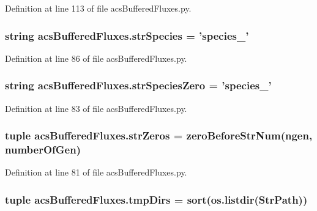 Definition at line 113 of file acs\-Buffered\-Fluxes.\-py.

\hypertarget{a00092_a36518d8de93502466a6d4b2e62eb7734}{
\subsubsection[{str\-Species}]{\setlength{\rightskip}{0pt plus 5cm}string acs\-Buffered\-Fluxes.\-str\-Species = 'species\-\_\-'}}\label{a00092_a36518d8de93502466a6d4b2e62eb7734}


Definition at line 86 of file acs\-Buffered\-Fluxes.\-py.

\hypertarget{a00092_a658920d97b6df23e672e290d362033b4}{
\subsubsection[{str\-Species\-Zero}]{\setlength{\rightskip}{0pt plus 5cm}string acs\-Buffered\-Fluxes.\-str\-Species\-Zero = 'species\-\_\-'}}\label{a00092_a658920d97b6df23e672e290d362033b4}


Definition at line 83 of file acs\-Buffered\-Fluxes.\-py.

\hypertarget{a00092_abfa8fbc48a0ad5b6dff6914d6052b2b6}{
\subsubsection[{str\-Zeros}]{\setlength{\rightskip}{0pt plus 5cm}tuple acs\-Buffered\-Fluxes.\-str\-Zeros = {\bf zero\-Before\-Str\-Num}(ngen, {\bf number\-Of\-Gen})}}\label{a00092_abfa8fbc48a0ad5b6dff6914d6052b2b6}


Definition at line 81 of file acs\-Buffered\-Fluxes.\-py.

\hypertarget{a00092_af740eb0100dc7010628161baeaf9b474}{
\subsubsection[{tmp\-Dirs}]{\setlength{\rightskip}{0pt plus 5cm}tuple acs\-Buffered\-Fluxes.\-tmp\-Dirs = sort(os.\-listdir(Str\-Path))}}\label{a00092_af740eb0100dc7010628161baeaf9b474}


